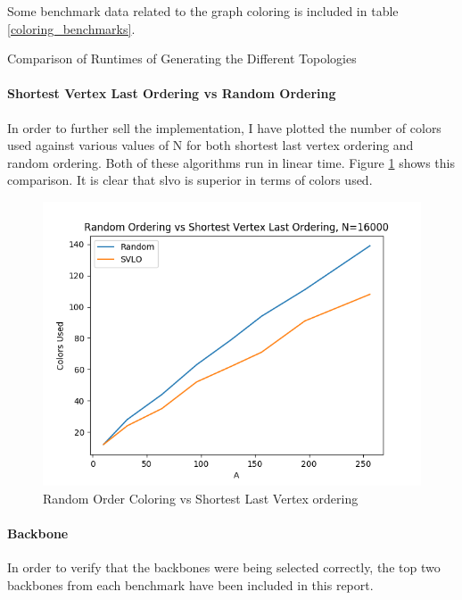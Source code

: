 \documentclass{article}
\begin{document}
    Some benchmark data related to the graph coloring is included in table \ref{coloring_benchmarks}.

    \begin{table}
      \centering
      \label{coloring_benchmarks}
  	  \caption{Comparison of Runtimes of Generating the Different Topologies}
    \end{table}

    \paragraph{Shortest Vertex Last Ordering vs Random Ordering}
    In order to further sell the implementation, I have plotted the number of colors used against various values of N for both shortest last vertex ordering and random ordering.
    Both of these algorithms run in linear time.
    Figure \ref{random_coloring_vs_slvo} shows this comparison.
    It is clear that slvo is superior in terms of colors used.

    \begin{figure}
      \centering
      \label{random_coloring_vs_slvo}
      \includegraphics[width=1 \textwidth]{comparison/number_colors.png}
      \caption{Random Order Coloring vs Shortest Last Vertex ordering}
    \end{figure}

    \paragraph{Backbone}
    In order to verify that the backbones were being selected correctly, the top two backbones from each benchmark have been included in this report.
\end{document}
